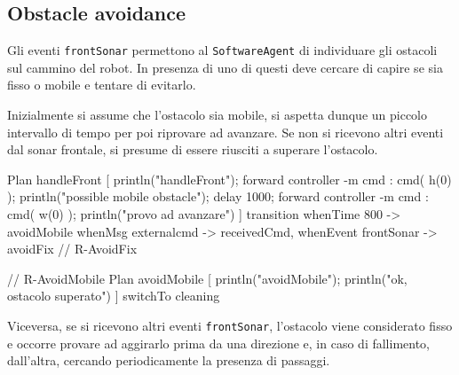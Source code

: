 \documentclass{../llncs}
\newcommand{\codescript}[1]{{\mbox{\small{\texttt{#1}}}}\xspace}
\begin{document}
\subsection{Obstacle avoidance}
Gli eventi \codescript{frontSonar} permettono al  \texttt{SoftwareAgent} di individuare gli ostacoli sul cammino del robot. In presenza di uno di questi deve cercare di capire se sia fisso o mobile e tentare di evitarlo.

Inizialmente si assume che l'ostacolo sia mobile, si aspetta dunque un piccolo intervallo di tempo per poi riprovare ad avanzare. Se non si ricevono altri eventi dal sonar frontale, si presume di essere riusciti a superare l'ostacolo.\\

\begin{qacode}[caption={SoftwareAgent, pt6}]
Plan handleFront [
	println("handleFront");
	forward controller -m cmd : cmd( h(0) );
	println("possible mobile obstacle");
	delay 1000;
	forward controller -m cmd : cmd( w(0) );
	println("provo ad avanzare")
]
transition
	whenTime 800 -> avoidMobile
	whenMsg externalcmd -> receivedCmd,
	whenEvent frontSonar -> avoidFix // R-AvoidFix
 
 // R-AvoidMobile
 Plan avoidMobile [
	println("avoidMobile");
	println("ok, ostacolo superato")
]
switchTo cleaning
\end{qacode}

Viceversa, se si ricevono altri eventi \codescript{frontSonar}, l'ostacolo viene considerato fisso e occorre provare ad aggirarlo prima da una direzione e, in caso di fallimento, dall'altra, cercando periodicamente la presenza di passaggi.\\
\end{document}
